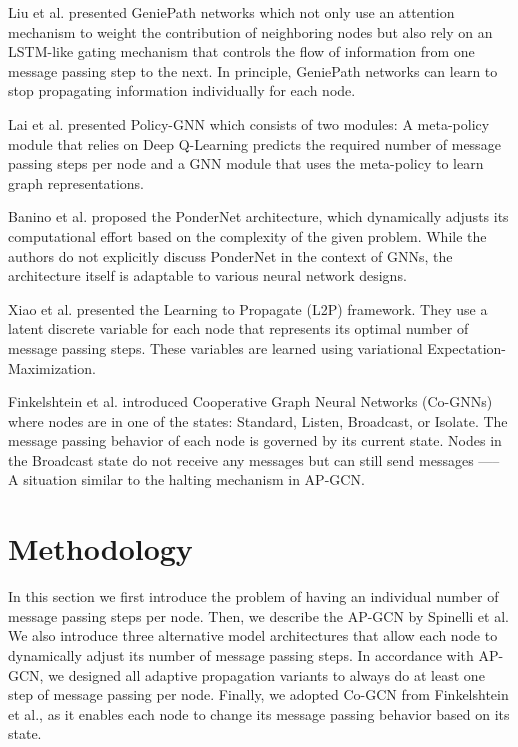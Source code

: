 \documentclass{gdl}
\begin{document}
Liu et al. \cite{liu2019} presented GeniePath networks which not only use an attention mechanism to weight the contribution of neighboring nodes but also rely on an LSTM-like gating mechanism that controls the flow of information from one message passing step to the next. In principle, GeniePath networks can learn to stop propagating information individually for each node.

Lai et al. \cite{lai2020} presented Policy-GNN which consists of two modules: A meta-policy module that relies on Deep Q-Learning predicts the required number of message passing steps per node and a GNN module that uses the meta-policy to learn graph representations.

Banino et al. \cite{banino2021} proposed the PonderNet architecture, which dynamically adjusts its computational effort based on the complexity of the given problem. While the authors do not explicitly discuss PonderNet in the context of GNNs, the architecture itself is adaptable to various neural network designs.

Xiao et al. \cite{xiao2021} presented the Learning to Propagate (L2P) framework. They use a latent discrete variable for each node that represents its optimal number of message passing steps. These variables are learned using variational Expectation-Maximization.

Finkelshtein et al. \cite{finkelshtein2024} introduced Cooperative Graph Neural Networks (Co-GNNs) where nodes are in one of the states: Standard, Listen, Broadcast, or Isolate. The message passing behavior of each node is governed by its current state. Nodes in the Broadcast state do not receive any messages but can still send messages —-- A situation similar to the halting mechanism in AP-GCN.

\section{Methodology}
In this section we first introduce the problem of having an individual number of message passing steps per node. Then, we describe the AP-GCN by Spinelli et al. We also introduce three alternative model architectures that allow each node to dynamically adjust its number of message passing steps. In accordance with AP-GCN, we designed all adaptive propagation variants to always do at least one step of message passing per node. Finally, we adopted Co-GCN from Finkelshtein et al., as it enables each node to change its message passing behavior based on its state.
\end{document}
